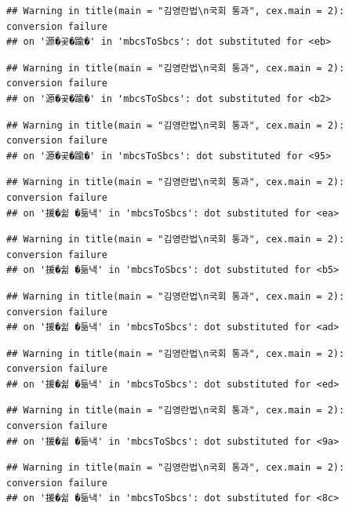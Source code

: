 \documentclass[
]{article}
\begin{document}
\begin{verbatim}
## Warning in title(main = "김영란법\n국회 통과", cex.main = 2): conversion failure
## on '源�곷�踰�' in 'mbcsToSbcs': dot substituted for <eb>
\end{verbatim}

\begin{verbatim}
## Warning in title(main = "김영란법\n국회 통과", cex.main = 2): conversion failure
## on '源�곷�踰�' in 'mbcsToSbcs': dot substituted for <b2>
\end{verbatim}

\begin{verbatim}
## Warning in title(main = "김영란법\n국회 통과", cex.main = 2): conversion failure
## on '源�곷�踰�' in 'mbcsToSbcs': dot substituted for <95>
\end{verbatim}

\begin{verbatim}
## Warning in title(main = "김영란법\n국회 통과", cex.main = 2): conversion failure
## on '援�쉶 �듦낵' in 'mbcsToSbcs': dot substituted for <ea>
\end{verbatim}

\begin{verbatim}
## Warning in title(main = "김영란법\n국회 통과", cex.main = 2): conversion failure
## on '援�쉶 �듦낵' in 'mbcsToSbcs': dot substituted for <b5>
\end{verbatim}

\begin{verbatim}
## Warning in title(main = "김영란법\n국회 통과", cex.main = 2): conversion failure
## on '援�쉶 �듦낵' in 'mbcsToSbcs': dot substituted for <ad>
\end{verbatim}

\begin{verbatim}
## Warning in title(main = "김영란법\n국회 통과", cex.main = 2): conversion failure
## on '援�쉶 �듦낵' in 'mbcsToSbcs': dot substituted for <ed>
\end{verbatim}

\begin{verbatim}
## Warning in title(main = "김영란법\n국회 통과", cex.main = 2): conversion failure
## on '援�쉶 �듦낵' in 'mbcsToSbcs': dot substituted for <9a>
\end{verbatim}

\begin{verbatim}
## Warning in title(main = "김영란법\n국회 통과", cex.main = 2): conversion failure
## on '援�쉶 �듦낵' in 'mbcsToSbcs': dot substituted for <8c>
\end{verbatim}
\end{document}
